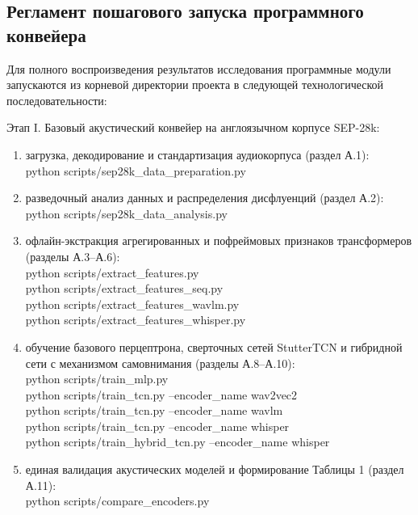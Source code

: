 \documentclass[a4paper,14pt]{extarticle}
\begin{document}
	\subsection*{Регламент пошагового запуска программного конвейера}
	Для полного воспроизведения результатов исследования программные модули запускаются из корневой директории проекта в следующей технологической последовательности:
	
	Этап I. Базовый акустический конвейер на англоязычном корпусе SEP-28k:
	\begin{enumerate}
		\item загрузка, декодирование и стандартизация аудиокорпуса (раздел А.1):\\
		python scripts/sep28k\_data\_preparation.py
		\item разведочный анализ данных и распределения дисфлуенций (раздел А.2):\\
		python scripts/sep28k\_data\_analysis.py
		\item офлайн-экстракция агрегированных и пофреймовых признаков трансформеров (разделы А.3--А.6):\\
		python scripts/extract\_features.py\\
		python scripts/extract\_features\_seq.py\\
		python scripts/extract\_features\_wavlm.py\\
		python scripts/extract\_features\_whisper.py
		\item обучение базового перцептрона, сверточных сетей StutterTCN и гибридной сети с механизмом самовнимания (разделы А.8--А.10):\\
		python scripts/train\_mlp.py\\
		python scripts/train\_tcn.py --encoder\_name wav2vec2\\
		python scripts/train\_tcn.py --encoder\_name wavlm\\
		python scripts/train\_tcn.py --encoder\_name whisper\\
		python scripts/train\_hybrid\_tcn.py --encoder\_name whisper
		\item единая валидация акустических моделей и формирование Таблицы 1 (раздел А.11):\\
		python scripts/compare\_encoders.py
	\end{enumerate}
	
\end{document}
